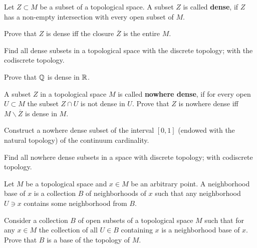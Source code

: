 \documentclass[12pt]{article}
\begin{document}
\begin{opredelenie}
  Let $Z\subset M$ be a subset of a topological space.  A subset $Z$
  is called {\bf dense}, if $Z$ has a non-empty intersection with
  every open subset of $M$.
\end{opredelenie}

\begin{zadacha}[!]
  Prove that $Z$ is dense iff the closure $\overline{Z}$ is the entire
  $M$.
\end{zadacha}

\begin{zadacha}
  Find all dense subsets in a topological space with the discrete
  topology; with the codiscrete topology.
\end{zadacha}

\begin{zadacha}
Prove that ${\mathbb Q}$ is dense in ${\mathbb R}$.
\end{zadacha}

\begin{zadacha}[!]
A subset $Z$ in a topological space $M$ is called {\bf nowhere dense},
if for every open $U\subset M$ the subset $Z\cap U$ is not
dense in $U$. Prove that $Z$ is nowhere dense iff $M\backslash
\overline{Z}$ is dense in $M$.
\end{zadacha}

\begin{zadacha}[*] 
  Construct a nowhere dense subset of the interval $[0, 1]$ (endowed
  with the natural topology) of the continuum cardinality.
\end{zadacha}

\begin{zadacha}
Find all nowhere dense subsets in a space with discrete topology; with
codiscrete topology.
\end{zadacha}

\begin{opredelenie}
Let $M$ be a topological space and $x\in M$ be an arbitrary
point. A neighborhood base of $x$ is a collection $B$ of
neighborhoods of $x$ such that any neighborhood $U\ni x$ contains some
neighborhood from $B$.
\end{opredelenie}

\begin{zadacha}
Consider a collection $B$ of open subsets of a topological space $M$
such that for any $x\in M$ the collection of all
$U\in B$ containing $x$ is a neighborhood base of $x$. Prove that
$B$ is a base of the topology of $M$.
\end{zadacha}
\end{document}
